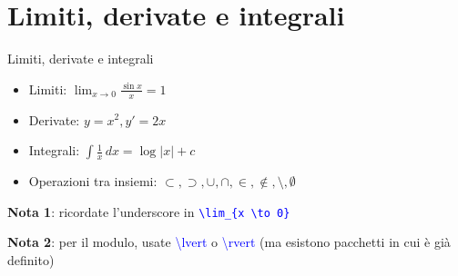 \section{Limiti, derivate e integrali}
  \begin{frame}{Limiti, derivate e integrali}
    
    \begin{itemize}
      \item<1-> Limiti: $\lim_{x \to 0} \frac{\sin x}{x} = 1$
      \item<2-> Derivate: $y = x^2, y' = 2x$
      \item<3-> Integrali: $\int \frac{1}{x}\,dx = \log \lvert x \rvert + c$
      \item<4-> Operazioni tra insiemi: $\subset, \supset, \cup, \cap, \in, \notin, \setminus, \emptyset$
    \end{itemize}
    
    \textbf{Nota 1}: ricordate l'underscore in \texttt{\textcolor{blue}{\textbackslash lim\_\{x \textbackslash to 0\}}}

    \textbf{Nota 2}: per il modulo, usate \textcolor{blue}{\textbackslash lvert} o \textcolor{blue}{\textbackslash rvert} (ma esistono pacchetti in cui è già definito)

\end{frame}
